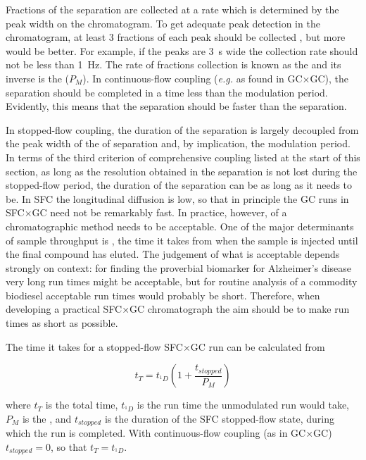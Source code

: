 Fractions of the \oneD separation are collected at a rate which is determined
by the peak width on the \oneD chromatogram. To get adequate peak detection in
the \oneD chromatogram, at least \num{3} fractions of each \oneD peak should be
collected \autocite{Murphy1998}, but more would be better. For example, if the peaks
are \SI{3}{s} wide the collection rate should not be less than \SI{1}{\hertz}.
The rate of fractions collection is known as the  and
its inverse is the  (\(P_M\)). In continuous-flow
coupling (\textit{e.g.} as found in GC×GC), the \twoD separation should be
completed in a time less than the modulation period. Evidently, this means that
the \twoD separation should be faster than the \oneD separation.

In stopped-flow coupling, the duration of the \twoD separation is largely
decoupled from the peak width of the of \oneD separation and, by implication,
the \oneD modulation period. In terms of the third criterion of comprehensive
coupling listed at the start of this section, as long as the resolution obtained
in the \oneD separation is not lost during the stopped-flow period, the duration
of the \twoD separation can be as long as it needs to be. In SFC the
longitudinal diffusion is low, so that in principle the \twoD GC runs in SFC×GC
need not be remarkably fast. In practice, however, 
of a chromatographic method needs to be acceptable. One of the major
determinants of sample throughput is , the time it takes from
when the sample is injected until the final compound has eluted. The judgement
of what is acceptable depends strongly on context: for finding the proverbial
biomarker for Alzheimer's disease very long run times might be acceptable, but
for routine analysis of a commodity biodiesel acceptable run times would
probably be short.
Therefore, when developing a practical SFC×GC chromatograph the aim should be to
make run times as short as possible.

The time it takes for a stopped-flow SFC×GC run can be calculated from

\[t_{T} = t_{^{1}D} ( 1 + \frac{t_{stopped}}{P_{M}} ) \]

where \(t_T\) is the total time, \(t_{^{1}D}\) is the run time the unmodulated
\oneD run would take, \(P_M\) is the , and
\(t_{stopped}\) is the duration of the SFC stopped-flow state, during which the
\twoD run is completed. With continuous-flow coupling (as in GC×GC) \(
t_{stopped}=0 \), so that \(t_{T} = t_{^{1}D}\).


